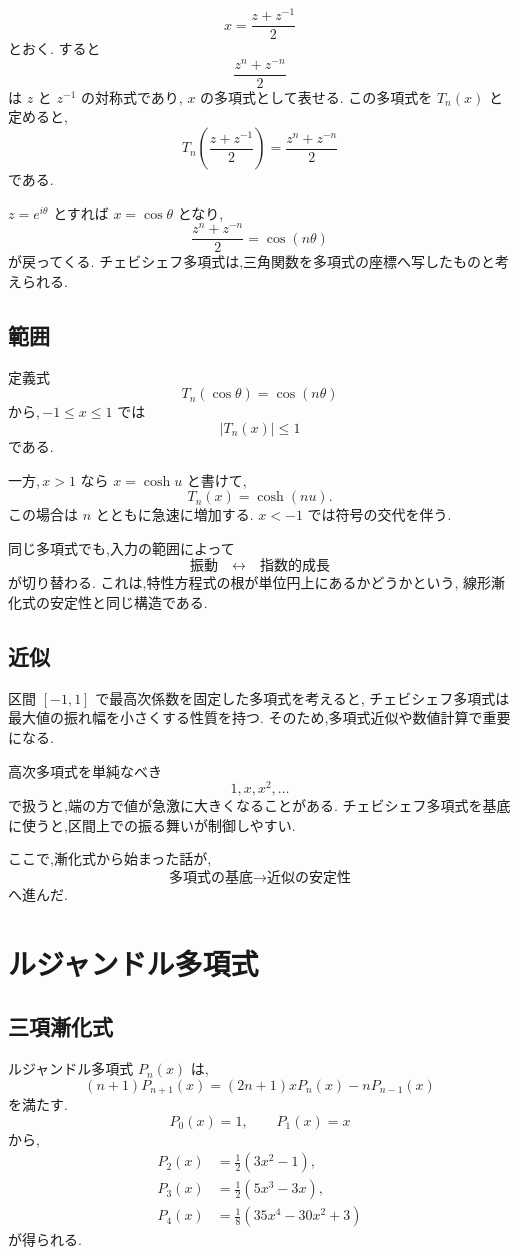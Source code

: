\[
  x=\frac{z+z^{-1}}2
\]
とおく.
すると
\[
  \frac{z^n+z^{-n}}2
\]
は $z$ と $z^{-1}$ の対称式であり,
$x$ の多項式として表せる.
この多項式を $T_n(x)$ と定めると,
\[
  T_n\left(\frac{z+z^{-1}}2\right)
  =\frac{z^n+z^{-n}}2
\]
である.

$z=e^{i\theta}$ とすれば $x=\cos\theta$ となり,
\[
  \frac{z^n+z^{-n}}2=\cos(n\theta)
\]
が戻ってくる.
チェビシェフ多項式は,三角関数を多項式の座標へ写したものと考えられる.

\subsection{範囲}

定義式
\[
  T_n(\cos\theta)=\cos(n\theta)
\]
から,\,$-1\le x\le1$ では
\[
  |T_n(x)|\le1
\]
である.

一方,\,$x>1$ なら $x=\cosh u$ と書けて,
\[
  T_n(x)=\cosh(nu).
\]
この場合は $n$ とともに急速に増加する.
$x<-1$ では符号の交代を伴う.

同じ多項式でも,入力の範囲によって
\[
  \text{振動}\quad\longleftrightarrow\quad\text{指数的成長}
\]
が切り替わる.
これは,特性方程式の根が単位円上にあるかどうかという,
線形漸化式の安定性と同じ構造である.

\subsection{近似}

区間 $[-1,1]$ で最高次係数を固定した多項式を考えると,
チェビシェフ多項式は最大値の振れ幅を小さくする性質を持つ.
そのため,多項式近似や数値計算で重要になる.

高次多項式を単純なべき
\[
  1,x,x^2,\ldots
\]
で扱うと,端の方で値が急激に大きくなることがある.
チェビシェフ多項式を基底に使うと,区間上での振る舞いが制御しやすい.

ここで,漸化式から始まった話が,
\[
  \text{多項式の基底}
  \longrightarrow
  \text{近似の安定性}
\]
へ進んだ.

\section{ルジャンドル多項式}

\subsection{三項漸化式}

ルジャンドル多項式 $P_n(x)$ は,
\[
  (n+1)P_{n+1}(x)
  =(2n+1)xP_n(x)-nP_{n-1}(x)
\]
を満たす.
\[
  P_0(x)=1,\qquad P_1(x)=x
\]
から,
\[
\begin{align*}
  P_2(x)&=\frac12(3x^2-1),\\
  P_3(x)&=\frac12(5x^3-3x),\\
  P_4(x)&=\frac18(35x^4-30x^2+3)
\end{align*}
\]
が得られる.

